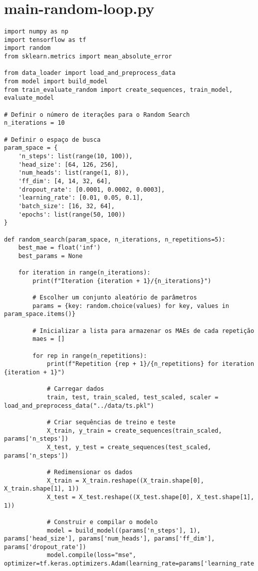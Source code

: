 \section{main-random-loop.py}
\begin{lstlisting}
import numpy as np
import tensorflow as tf
import random
from sklearn.metrics import mean_absolute_error

from data_loader import load_and_preprocess_data
from model import build_model
from train_evaluate_random import create_sequences, train_model, evaluate_model

# Definir o número de iterações para o Random Search
n_iterations = 10

# Definir o espaço de busca
param_space = {
    'n_steps': list(range(10, 100)),
    'head_size': [64, 126, 256],
    'num_heads': list(range(1, 8)),
    'ff_dim': [4, 14, 32, 64],
    'dropout_rate': [0.0001, 0.0002, 0.0003],
    'learning_rate': [0.01, 0.05, 0.1],
    'batch_size': [16, 32, 64],
    'epochs': list(range(50, 100))
}

def random_search(param_space, n_iterations, n_repetitions=5):
    best_mae = float('inf')
    best_params = None

    for iteration in range(n_iterations):
        print(f"Iteration {iteration + 1}/{n_iterations}")
        
        # Escolher um conjunto aleatório de parâmetros
        params = {key: random.choice(values) for key, values in param_space.items()}
        
        # Inicializar a lista para armazenar os MAEs de cada repetição
        maes = []

        for rep in range(n_repetitions):
            print(f"Repetition {rep + 1}/{n_repetitions} for iteration {iteration + 1}")

            # Carregar dados
            train, test, train_scaled, test_scaled, scaler = load_and_preprocess_data("../data/ts.pkl")
            
            # Criar sequências de treino e teste
            X_train, y_train = create_sequences(train_scaled, params['n_steps'])
            X_test, y_test = create_sequences(test_scaled, params['n_steps'])
            
            # Redimensionar os dados
            X_train = X_train.reshape((X_train.shape[0], X_train.shape[1], 1))
            X_test = X_test.reshape((X_test.shape[0], X_test.shape[1], 1))
            
            # Construir e compilar o modelo
            model = build_model((params['n_steps'], 1), params['head_size'], params['num_heads'], params['ff_dim'], params['dropout_rate'])
            model.compile(loss="mse", optimizer=tf.keras.optimizers.Adam(learning_rate=params['learning_rate']))
            

\end{lstlisting}
